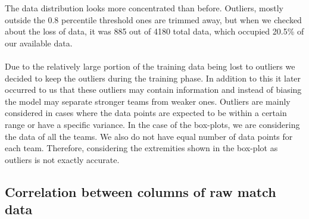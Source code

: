 \documentclass[a4paper,12pt]{article}
\begin{document}
	The data distribution looks more concentrated than before. Outliers, mostly outside the 0.8 percentile threshold ones are trimmed away, but when we checked about the loss of data, it was 885 out of 4180 total data, which occupied 20.5\% of our available data.\\
	\\
	Due to the relatively large portion of the training data being lost to outliers we decided to keep the outliers during the training phase. In addition to this it later occurred to us that these outliers may contain information and instead of biasing the model may separate stronger teams from weaker ones. Outliers are mainly considered in cases where the data points are expected to be within a certain range or have a specific variance. In the case of the box-plots, we are considering the data of all the teams. We also do not have equal number of data points for each team. Therefore, considering the extremities shown in the box-plot as outliers is not exactly accurate.
	
	\subsection{Correlation between columns of raw match data }
	
\end{document}
